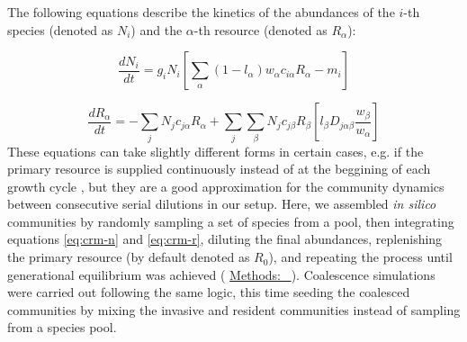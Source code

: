 \documentclass[a4paper,10pt]{article}
\newcommand{\methodsref}[1]{%
  \hyperref[{methods:#1}]{%
   Methods:~\nameref*{methods:#1}%
  }%
}
\begin{document}
\begin{mdframed}
The following equations describe the kinetics of the abundances
of the $i$-th species (denoted as $N_i$)
and the $\alpha$-th resource (denoted as $R_\alpha$):

\begin{equation}
\frac{dN_i}{dt} = 
g_i N_i
\left[
\sum_\alpha \left( 1-l_\alpha \right)
w_\alpha c_{i\alpha} R_\alpha
- m_i
\right]
\label{eq:crm-n}
\end{equation}

\begin{equation}
\frac{dR_\alpha}{dt} = 
- \sum_j N_j c_{j\alpha} R_\alpha
+ \sum_j \sum_\beta N_j c_{j\beta} R_\beta
\left[
l_\beta D_{j\alpha\beta} \frac{w_\beta}{w_\alpha}
\right]
\label{eq:crm-r}
\end{equation}
%
These equations can take slightly different forms in certain cases,
e.g. if the primary resource is supplied continuously instead of at the beggining
of each growth cycle \cite{Marsland2019,Marsland2020},
but they are a good approximation for the community dynamics between consecutive
serial dilutions in our setup.
Here, we assembled \textit{in silico} communities by randomly
sampling a set of species from a pool,
then integrating equations \ref{eq:crm-n} and \ref{eq:crm-r},
diluting the final abundances,
replenishing the primary resource (by default denoted as $R_0$),
and repeating the process until generational equilibrium was achieved
(\methodsref{sim}).
Coalescence simulations were carried out following the same logic,
this time seeding the coalesced communities by mixing the invasive and resident
communities instead of sampling from a species pool.

\bigskip
\end{mdframed}

\clearpage
\end{document}
